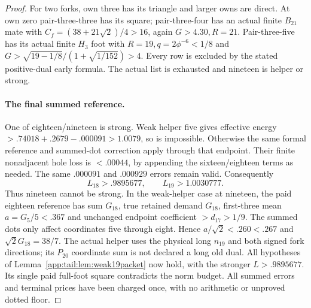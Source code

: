 \begin{proof}
For two forks, own three has its triangle and larger owns are direct.
At own zero pair-three-three has its square; pair-three-four has
an actual finite $B_{21}$ mate with
$C_f=(38+21\sqrt2)/4>16$, again $G>4.30,R=21$.
Pair-three-five has its actual finite $H_3$ foot with
$R=19,q=2\phi^{-6}<1/8$ and
$G>\sqrt{19-1/8}/(1+\sqrt{1/152})>4$.
Every row is excluded by the stated positive-dual early formula.
The actual list is exhausted and nineteen is helper or strong.

\paragraph{The final summed reference.}
One of eighteen/nineteen is strong. Weak helper five gives effective
energy $>.74018+.2679-.000091>1.0079$, so is impossible.
Otherwise the same formal reference and summed-dot correction apply
through that endpoint. Their finite nonadjacent hole loss is
$<.00044$, by appending the sixteen/eighteen terms as needed.
The same $.000091$ and $.000929$ errors remain valid. Consequently
\[
 L_{18}>.9895677,\qquad L_{19}>1.0030777.
\]
Thus nineteen cannot be strong. In the weak-helper case at nineteen,
the paid eighteen reference has sum $G_{18}$, true retained demand
$G_{18}$, first-three mean $a=G_5/5<.367$ and unchanged endpoint
coefficient $>d_{17}>1/9$. The summed dots only affect coordinates
five through eight. Hence $a/\sqrt2<.260<.267$ and
$\sqrt2G_{18}=38/7$. The actual helper uses the physical long
$n_{19}$ and both signed fork directions; its $P_{20}$ coordinate
sum is not declared a long old dual.
All hypotheses of Lemma~\ref{app:tail:lem:weak19packet} now hold,
with the stronger $L>.9895677$. Its single paid full-foot square
contradicts the norm budget. All summed errors and terminal prices
have been charged once, with no arithmetic or unproved dotted floor.
\end{proof}

